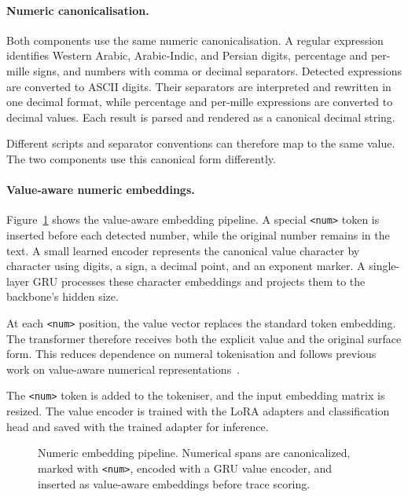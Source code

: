 \paragraph{Numeric canonicalisation.}
Both components use the same numeric canonicalisation. A regular expression identifies Western
Arabic, Arabic-Indic, and Persian digits, percentage and per-mille signs, and numbers with comma or
decimal separators. Detected expressions are converted to ASCII digits. Their separators are
interpreted and rewritten in one decimal format, while percentage and per-mille expressions are
converted to decimal values. Each result is parsed and rendered as a canonical decimal string.

Different scripts and separator conventions can therefore map to the same value. The two components
use this canonical form differently.

\paragraph{Value-aware numeric embeddings.}
Figure~\ref{fig:numeric-embedding} shows the value-aware embedding pipeline. A special
\texttt{<num>} token is inserted before each detected number, while the original number remains in
the text. A small learned encoder represents the canonical value character by character using digits,
a sign, a decimal point, and an exponent marker. A single-layer GRU processes these character
embeddings and projects them to the backbone's hidden size.

At each \texttt{<num>} position, the value vector replaces the standard token embedding. The
transformer therefore receives both the explicit value and the original surface form. This reduces
dependence on numeral tokenisation and follows previous work on value-aware numerical
representations~\cite{dutulescu2026valueawarenumericalrepresentationstransformer,
schwartz2024numerologicnumberencodingenhanced}.

The \texttt{<num>} token is added to the tokeniser, and the input embedding matrix is resized. The
value encoder is trained with the LoRA adapters and classification head and saved with the trained
adapter for inference.

\begin{figure}[htbp]
  \centering
  
\caption{Numeric embedding pipeline. Numerical spans are canonicalized, marked with \texttt{<num>}, encoded with a GRU value encoder, and inserted as value-aware embeddings before trace scoring.}
\label{fig:numeric-embedding}
\end{figure}

